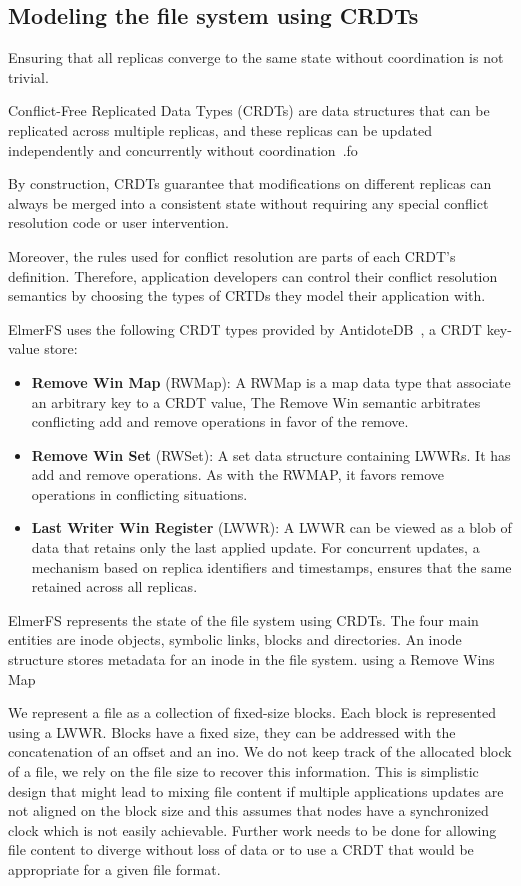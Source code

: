 \documentclass[sigconf, 10pt]{acmart}
\begin{document}
\subsection{Modeling the file system using CRDTs}

Ensuring that all replicas converge to the same state without coordination
is not trivial.

Conflict-Free Replicated Data Types (CRDTs) are data structures that
can be replicated across multiple replicas,
and these replicas can be updated independently and concurrently without coordination~\cite{shapiro2011conflict}.fo

By construction, CRDTs guarantee that modifications on different
replicas can always be merged into a consistent state without requiring
any special conflict resolution code or user intervention.

Moreover, the rules used for conflict resolution are parts of each CRDT's definition.
Therefore, application developers can control their conflict resolution semantics by
choosing the types of CRTDs they model their application with.

ElmerFS uses the following CRDT types provided by AntidoteDB~\cite{akkoorath2016antidote, akkoorath2016cure}, a CRDT key-value store:

\begin{itemize}
	\item \textbf{Remove Win Map} (RWMap): A RWMap is a map data type that associate an arbitrary key to a CRDT value, The Remove Win semantic arbitrates conflicting add and remove operations in favor of the remove.
	\item \textbf{Remove Win Set} (RWSet): A set data structure containing LWWRs. It has add and
    remove operations. As with the RWMAP, it favors remove operations in conflicting situations.
	\item \textbf{Last Writer Win Register} (LWWR): A LWWR can be viewed as a blob of data that retains only the last applied update.
    For concurrent updates, a mechanism based on replica identifiers and timestamps, ensures that the same retained across all replicas.
\end{itemize}

ElmerFS represents the state of the file system using CRDTs.
The four main entities are inode objects, symbolic links, blocks and directories.
An inode structure stores metadata for an inode in the file system. using a Remove Wins Map

We represent a file as a collection of fixed-size blocks. Each block is represented using a LWWR. Blocks have a fixed size, they can be addressed with the concatenation of an offset and an ino.
We do not keep track of the allocated block of a file, we rely on the file size to recover this information. This is simplistic design that might lead to mixing file content if multiple applications updates are not aligned on the block size and this assumes that nodes have a synchronized clock which is not easily achievable. Further work needs to be done for allowing file content to diverge without loss of data or to use a CRDT that would be appropriate for a given file format.
\end{document}
